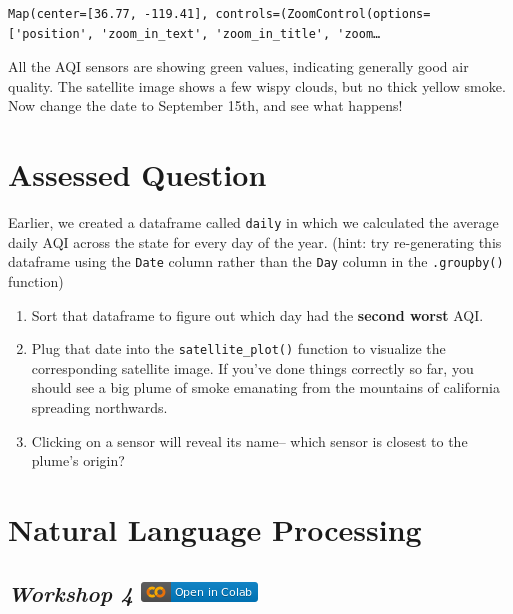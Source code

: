 \documentclass[
  letterpaper,
  DIV=11,
  numbers=noendperiod]{scrreprt}
\providecommand{\tightlist}{%
  \setlength{\itemsep}{0pt}\setlength{\parskip}{0pt}}\usepackage{longtable,booktabs,array}
\begin{document}
\begin{verbatim}
Map(center=[36.77, -119.41], controls=(ZoomControl(options=['position', 'zoom_in_text', 'zoom_in_title', 'zoom…
\end{verbatim}

All the AQI sensors are showing green values, indicating generally good
air quality. The satellite image shows a few wispy clouds, but no thick
yellow smoke. Now change the date to September 15th, and see what
happens!


\hypertarget{assessed-question-2}{%
\chapter{Assessed Question}\label{assessed-question-2}}

Earlier, we created a dataframe called \texttt{daily} in which we
calculated the average daily AQI across the state for every day of the
year. (hint: try re-generating this dataframe using the \texttt{Date}
column rather than the \texttt{Day} column in the \texttt{.groupby()}
function)

\begin{enumerate}
\def\labelenumi{\arabic{enumi}.}
\tightlist
\item
  Sort that dataframe to figure out which day had the \textbf{second
  worst} AQI.
\item
  Plug that date into the \texttt{satellite\_plot()} function to
  visualize the corresponding satellite image. If you've done things
  correctly so far, you should see a big plume of smoke emanating from
  the mountains of california spreading northwards.
\item
  Clicking on a sensor will reveal its name-- which sensor is closest to
  the plume's origin?
\end{enumerate}


\hypertarget{natural-language-processing}{%
\chapter{Natural Language
Processing}\label{natural-language-processing}}

\hypertarget{workshop-4-open-in-colab}{%
\section[\emph{Workshop 4} ]{\texorpdfstring{\emph{Workshop 4}
\href{https://colab.research.google.com/github/oballinger/QM2/blob/main/notebooks/W04.\%20Natural\%20Language\%20Processing.ipynb}{\protect\includegraphics{index_files/mediabag/colab-badge.png}}}{Workshop 4 Open In Colab}}\label{workshop-4-open-in-colab}}
\end{document}
